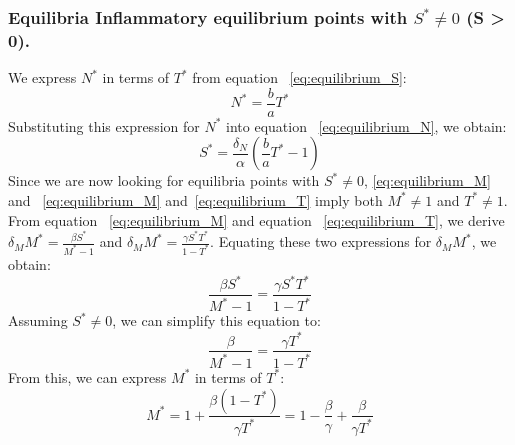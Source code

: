 \documentclass[a4paper, 12pt]{article}
\providecommand{\DIFaddtex}[1]{{\protect\color{blue} \sf #1}} %
\providecommand{\DIFdeltex}[1]{{\protect\color{red} \scriptsize #1}} %
\providecommand{\DIFaddbegin}{} %
\providecommand{\DIFaddend}{} %
\providecommand{\DIFdelbegin}{} %
\providecommand{\DIFdelend}{} %
\providecommand{\DIFadd}[1]{\texorpdfstring{\DIFaddtex{#1}}{#1}} %
\providecommand{\DIFdel}[1]{\texorpdfstring{\DIFdeltex{#1}}{}} %
\begin{document}
\subsubsection{\DIFdelbegin \DIFdel{Equilibria }\DIFdelend \DIFaddbegin \DIFadd{Inflammatory equilibrium }\DIFaddend points \DIFdelbegin \DIFdel{with $S^* \neq 0$}\DIFdelend \DIFaddbegin \DIFadd{(S > 0)}\DIFaddend .}\DIFaddbegin \label{sec:inflammatory_equilibria}
\DIFaddend We express $N^*$ in terms of $T^*$ from equation\DIFaddbegin \DIFadd{~}\DIFaddend \eqref{eq:equilibrium_S}:
\begin{equation}
N^* = \frac{b}{a} T^*
\label{eq:N_in_terms_of_T}
\end{equation}
Substituting this expression for $N^*$ into equation\DIFaddbegin \DIFadd{~}\DIFaddend \eqref{eq:equilibrium_N}, we obtain:
\begin{equation}
S^* = \frac{\delta_N}{\alpha} \left(\frac{b}{a} T^* - 1\right)
\label{eq:S_in_terms_of_T}
\end{equation}
Since we are now looking for equilibria points with $S^* \neq 0$,\DIFdelbegin \DIFdel{\eqref{eq:equilibrium_M} and }\DIFdelend \DIFaddbegin \DIFadd{~\eqref{eq:equilibrium_M} and~}\DIFaddend \eqref{eq:equilibrium_T} imply both $M^* \neq 1$ and $T^* \neq 1$.
From equation\DIFaddbegin \DIFadd{~}\DIFaddend \eqref{eq:equilibrium_M} and equation\DIFaddbegin \DIFadd{~}\DIFaddend \eqref{eq:equilibrium_T}, 
we derive  $\delta_M M^* = \frac{\beta S^*}{M^* - 1}$ and $\delta_M M^* = \frac{\gamma S^* T^*}{1 - T^*}$.
Equating these two expressions for $\delta_M M^*$, we obtain:
\[\frac{\beta S^*}{M^* - 1} = \frac{\gamma S^* T^*}{1 - T^*}
\]
Assuming $S^* \neq 0$, we can simplify this equation to:
\[\frac{\beta}{M^* - 1} = \frac{\gamma T^*}{1 - T^*}
\]
From this, we can express $M^*$ in terms of $T^*$:
\begin{equation}
M^* = 1 + \frac{\beta (1 - T^*)}{\gamma T^*} = 1 - \frac{\beta}{\gamma} + \frac{\beta}{\gamma T^*}
\label{eq:M_in_terms_of_T}
\end{equation}  
\end{document}
